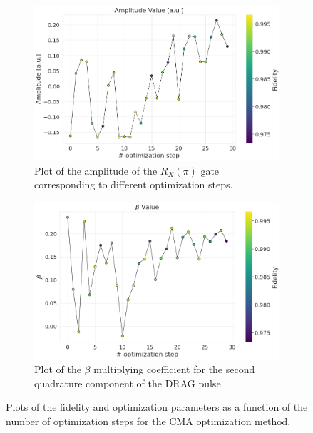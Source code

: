 \begin{figure}[h]
    \begin{subfigure}[t]{0.495\textwidth}
        \includegraphics[width=\textwidth]{figures/png/RB_optimization/CMA/CMA_amplitude.png}
        \caption{Plot of the amplitude of the $R_X(\pi)$ gate corresponding to different optimization steps.}
        \label{fig:CMA:amplitude}
    \end{subfigure}
    \hfill
    \begin{subfigure}[t]{0.495\textwidth}
        \includegraphics[width=\textwidth]{figures/png/RB_optimization/CMA/beta_CMA.png}
        \caption{Plot of the $\beta$ multiplying coefficient for the second quadrature component of the DRAG pulse.}
        \label{fig:CMA:beta}
    \end{subfigure}

    \caption{Plots of the fidelity and optimization parameters as a function of the number of optimization steps for the CMA optimization method.}
    \label{fig:CMA_plots}
\end{figure}

